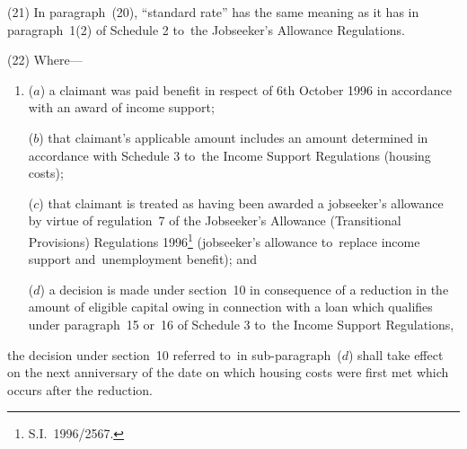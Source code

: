 \documentclass[12pt,a4paper]{article}
\begin{document}
(21) In paragraph~(20), “standard rate” has the same meaning as it has in paragraph~1(2) of Schedule 2 to~the Jobseeker’s Allowance Regulations.

(22) Where—
\begin{enumerate}\item[]
($a$) a claimant was paid benefit in respect of 6th October 1996 in accordance with an award of income support;

($b$) that claimant’s applicable amount includes an amount determined in accordance with Schedule 3 to~the Income Support Regulations (housing costs);

($c$) that claimant is treated as having been awarded a jobseeker’s allowance by virtue of regulation~7 of the Jobseeker’s Allowance (Transitional Provisions) Regulations 1996\footnote{\frenchspacing S.I.~1996/2567.} (jobseeker’s allowance to~replace income support and~unemployment benefit); and

($d$) a decision is made under section~10 in consequence of a reduction in the amount of eligible capital owing in connection with a loan which qualifies under paragraph~15 or~16 of Schedule 3 to~the Income Support Regulations,
\end{enumerate}
the decision under section~10 referred to~in sub-paragraph~($d$) shall take effect on the next anniversary of the date on which housing costs were first met which occurs after the reduction.

\end{document}
